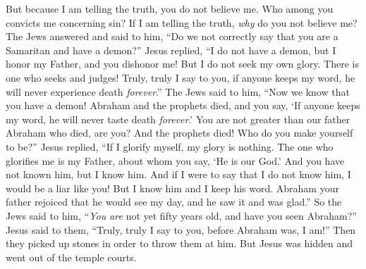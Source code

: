 \begin{biblechapter}
\verse But because I am telling the truth, you do not believe me.
\verse Who among you convicts me concerning sin? If I am telling the truth, \textit{why} do you not believe me?
\verse The Jews answered and said to him, “Do we not correctly say that you are a Samaritan and have a demon?”
\verse Jesus replied, “I do not have a demon, but I honor my Father, and you dishonor me!
\verse But I do not seek my own glory. There is one who seeks and judges!
\verse Truly, truly I say to you, if anyone keeps my word, he will never experience death \textit{forever}.”
\verse The Jews said to him, “Now we know that you have a demon! Abraham and the prophets died, and you say, ‘If anyone keeps my word, he will never taste death \textit{forever}.’
\verse You are not greater than our father Abraham who died, are you? And the prophets died! Who do you make yourself to be?”
\verse Jesus replied, “If I glorify myself, my glory is nothing. The one who glorifies me is my Father, about whom you say, ‘He is our God.’
\verse And you have not known him, but I know him. And if I were to say that I do not know him, I would be a liar like you! But I know him and I keep his word.
\verse Abraham your father rejoiced that he would see my day, and he saw it and was glad.”
\verse So the Jews said to him, “\textit{You are} not yet fifty years old, and have you seen Abraham?”
\verse Jesus said to them, “Truly, truly I say to you, before Abraham was, I am!”
\verse Then they picked up stones in order to throw them at him. But Jesus was hidden and went out of the temple courts.
\end{biblechapter}

